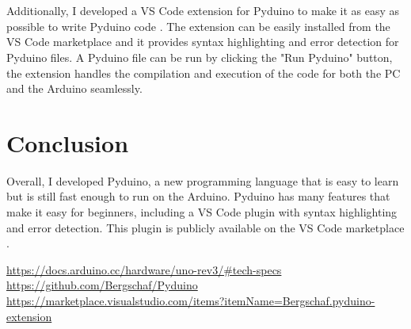 \documentclass{article}
\begin{document}
\begin{multicols}{2}
\\\\
Additionally, I developed a VS Code extension for Pyduino to make it as easy as possible to write Pyduino code \cite{Q3}. The extension can be easily installed from the VS Code marketplace and it provides syntax highlighting and error detection for Pyduino files. A Pyduino file can be run by clicking the "Run Pyduino" button, the extension handles the compilation and execution of the code for both the PC and the Arduino seamlessly.
\section{Conclusion}
\noindent Overall, I developed Pyduino, a new programming language that is easy to learn but is still fast enough to run on the Arduino. Pyduino has many features that make it easy for beginners, including a VS Code plugin with syntax highlighting and error detection. This plugin is publicly available on the VS Code marketplace \cite{Q3}.


\begin{thebibliography}{99}
\url{https://docs.arduino.cc/hardware/uno-rev3/#tech-specs}
\url{https://github.com/Bergschaf/Pyduino}
\url{https://marketplace.visualstudio.com/items?itemName=Bergschaf.pyduino-extension}
\end{thebibliography}
\end{multicols}
\end{document}
